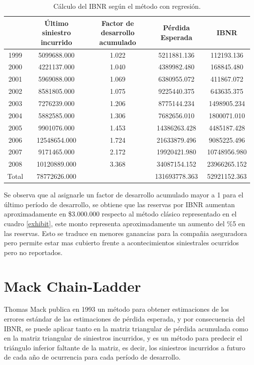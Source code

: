 \documentclass[
  12pt,
]{article}
\begin{document}
\begin{table}[ht]
\centering
\caption{Cálculo del IBNR según el método con regresión.} 
\label{exhibit2}
\begingroup\fontsize{10pt}{10pt}\selectfont
\begin{tabular}{ccccc}
  \hline
 & Último siniestro incurrido & Factor de desarrollo acumulado & Pérdida Esperada & IBNR \\ 
  \hline
1999 & 5099688.000 & 1.022 & 5211881.136 & 112193.136 \\ 
  2000 & 4221137.000 & 1.040 & 4389982.480 & 168845.480 \\ 
  2001 & 5969088.000 & 1.069 & 6380955.072 & 411867.072 \\ 
  2002 & 8581805.000 & 1.075 & 9225440.375 & 643635.375 \\ 
  2003 & 7276239.000 & 1.206 & 8775144.234 & 1498905.234 \\ 
  2004 & 5882585.000 & 1.306 & 7682656.010 & 1800071.010 \\ 
  2005 & 9901076.000 & 1.453 & 14386263.428 & 4485187.428 \\ 
  2006 & 12548654.000 & 1.724 & 21633879.496 & 9085225.496 \\ 
  2007 & 9171465.000 & 2.172 & 19920421.980 & 10748956.980 \\ 
  2008 & 10120889.000 & 3.368 & 34087154.152 & 23966265.152 \\ 
  Total & 78772626.000 &  & 131693778.363 & 52921152.363 \\ 
   \hline
\end{tabular}
\endgroup
\end{table}

Se observa que al asignarle un factor de desarrollo acumulado mayor a 1
para el último período de desarrollo, se obtiene que las reservas por
IBNR aumentan aproximadamente en \$3.000.000 respecto al método clásico
representado en el cuadro \ref{exhibit}, este monto representa
aproximadamente un aumento del \%5 en las reservas. Esto se traduce en
menores ganancias para la compañia aseguradora pero permite estar mas
cubierto frente a acontecimientos siniestrales ocurridos pero no
reportados.

\section{Mack Chain-Ladder}\label{mack-chain-ladder}

Thomas Mack publica en 1993 un método para obtener estimaciones de los
errores estándar de las estimaciones de pérdida esperada, y por
consecuencia del IBNR, se puede aplicar tanto en la matriz triangular de
pérdida acumulada como en la matriz triangular de siniestros incurridos,
y es un método para predecir el triángulo inferior faltante de la
matriz, es decir, los siniestros incurridos a futuro de cada año de
ocurrencia para cada período de desarrollo.
\end{document}
